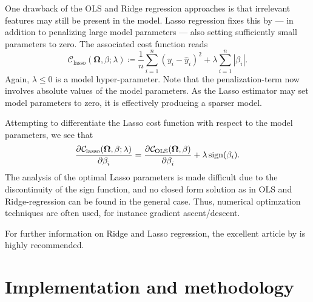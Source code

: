 \documentclass[dvipsnames, article, a4paper, oneside, 12pt]{memoir}
\newcommand{\OLS}{\mathrm{OLS}}
\newcommand{\lasso}{\mathrm{lasso}}
\newcommand{\sgn}{\,\mathrm{sign}{}}
\newcommand{\data}{\bm{\Omega}}
\newcommand{\cost}{\mathcal{C}}
\begin{document}
  One drawback of the OLS and Ridge regression approaches is that irrelevant
  features may still be present in the model. Lasso regression fixes this by
  --- in addition to penalizing large model parameters --- also setting
  sufficiently small parameters to zero. The associated cost function reads
  \begin{equation}
    \cost_{\lasso}(\data, \beta; \lambda) \coloneqq \frac{1}{n} \sum_{i=1}^n (y_i - \hat{y}_i)^2 + \lambda \sum_{i=1}^n |\beta_i|.
  \end{equation}
  Again, \( \lambda \leq 0 \) is a model hyper-parameter. Note that the
  penalization-term now involves absolute values of the model parameters. As
  the Lasso estimator may set model parameters to zero, it is effectively
  producing a sparser model. 

  
  Attempting to differentiate the Lasso cost function with respect to the model parameters, we see that
  \begin{equation}
    \dpd{\cost_\lasso(\data, \beta; \lambda)}{\beta_i} = \dpd{\cost_\OLS(\data, \beta)}{\beta_i} + \lambda \sgn(\beta_i).
  \end{equation}
  The analysis of the optimal Lasso parameters is made difficult due to the
  discontinuity of the sign function, and no closed form solution as in OLS and
  Ridge-regression can be found in the general case. Thus, numerical
  optimzation techniques are often used, for instance gradient ascent/descent.
  
  For further information on Ridge and Lasso regression, the excellent article
   by
  \textcite{vanwieringenLectureNotesRidge2015} is highly recommended.

  \chapter{Implementation and methodology}
  
\end{document}

